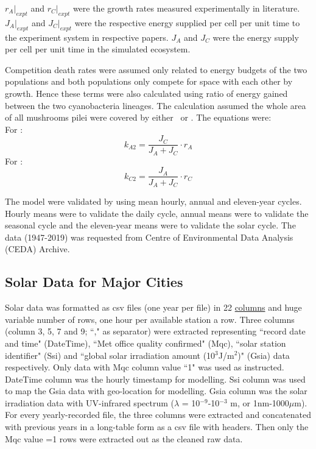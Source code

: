 \documentclass[../thesis.tex]{subfiles} %
\begin{document}
$r_A|_{expt}$ and $r_C|_{expt}$ were the growth rates measured experimentally in literature.  $J_A|_{expt}$ and $J_C|_{expt}$ were the respective energy supplied per cell per unit time to the experiment system in respective papers.  $J_A$ and $J_C$ were the energy supply per cell per unit time in the simulated ecosystem.

Competition death rates were assumed only related to energy budgets of the two populations and both populations only compete for space with each other by growth.  Hence these terms were also calculated using ratio of energy gained between the two cyanobacteria lineages.  The calculation assumed the whole area of all mushrooms pilei were covered by either \As\ or \Cs.  The equations were:\\
For \As:
\begin{equation}
    k_{A2} = \dfrac{J_C}{J_A + J_C}\cdot r_A
\end{equation}
For \Cs:
\begin{equation}
    k_{C2} = \dfrac{J_A}{J_A + J_C}\cdot r_C
\end{equation}

The model were validated by using mean hourly, annual and eleven-year cycles.  Hourly means were to validate the daily cycle, annual means were to validate the seasonal cycle and the eleven-year means were to validate the solar cycle.  The data (1947-2019) was requested from Centre of Environmental Data Analysis (CEDA) Archive.\autocite{solarData}

\subsection{Solar Data for Major Cities} %
Solar data was formatted as csv files (one year per file) in 22 \href{https://artefacts.ceda.ac.uk/badc_datadocs/ukmo-midas/RO_Table.html#definition}{columns} and huge variable number of rows, one hour per available station a row.  Three columns (column 3, 5, 7 and 9; ``," as separator) were extracted representing ``record date and time" (DateTime), ``Met office quality confirmed" (Mqc), ``solar station identifier" (Ssi) and ``global solar irradiation amount (10$^{3}$J/m$^{2}$)" (Gsia) data respectively.  Only data with Mqc column value ``1" was used as instructed.  DateTime column was the hourly timestamp for modelling. Ssi column was used to map the Gsia data with geo-location for modelling.  Gsia column was the solar irradiation data with UV-infrared spectrum ($\lambda$ = 10$^{-9}$-10$^{-3}$ m, or 1nm-1000$\mu$m).  For every yearly-recorded file, the three columns were extracted and concatenated with previous years in a long-table form as a csv file with headers.  Then only the Mqc value =1 rows were extracted out as the cleaned raw data.
\end{document}
